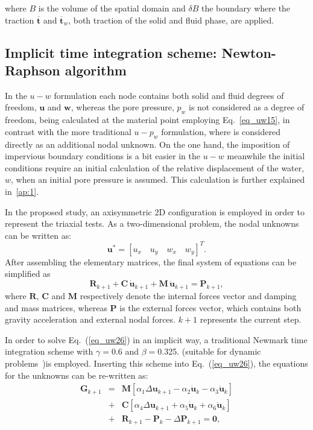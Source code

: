 \documentclass[preprint,12pt,a4paper]{elsarticle}
\begin{document}
where $B$ is the volume of the spatial domain and $\delta B$ the boundary where the traction $\boldsymbol{\overline{t}}$ and $\boldsymbol{\overline{t}}_w$, both traction of the solid and fluid phase, are applied.

\subsection{Implicit time integration scheme: Newton-Raphson algorithm}
\label{subsec:22}
In the $u-w$ formulation each node contains both solid and fluid degrees of freedom, $\boldsymbol{u}$ and $\boldsymbol{w}$, whereas the pore pressure, $p_w$ is not considered as a degree of freedom, being calculated at the material point employing Eq.~\eqref{eq_uw15}, in contrast with the more traditional  $u-p_w$ formulation, where is considered directly as an additional nodal unknown. On the one hand, the imposition of impervious boundary conditions is a bit easier in the $u-w$ meanwhile the initial conditions require an initial calculation of the relative displacement of the water, $w$, when an initial pore pressure is assumed. This calculation is further explained in~\ref{ap:1}.

In the proposed study, an axisymmetric 2D configuration is employed in order to represent the triaxial tests. As a two-dimensional problem, the nodal unknowns can be written as:
 $$
 \boldsymbol{u}^*=
 \left[ u_x \quad  u_y \quad   w_x \quad  w_y \right]^T.
$$
After assembling the elementary matrices, the final system of equations can be simplified as
\begin{equation}\label{eq_uw26}
 \boldsymbol{ R}_{k+1}  +  \boldsymbol{C}  \,   \boldsymbol{\dot{u}}_{k+1} +   \boldsymbol{M}   \, \boldsymbol {\ddot{u}}_{k+1}= \boldsymbol{P }_{k+1},
\end{equation}
where   $\boldsymbol{R}$, $ \boldsymbol{C}$ and $  \boldsymbol{ M}$ respectively denote the internal forces vector and damping and mass matrices, whereas $ \boldsymbol{P}$ is the external forces vector, which contains both gravity acceleration and external nodal forces. ${k+1}$ represents the current step.

In order to solve Eq.~(\ref{eq_uw26}) in an implicit way, a traditional Newmark time integration scheme with $\gamma=$0.6 and $\beta=$0.325. (suitable for dynamic problems~\cite{Kontoe2006})is employed. Inserting this scheme into Eq.~(\ref{eq_uw26}),  the equations for the unknowns can be re-written as:
\begin{eqnarray}\label{eq_uw30}
\boldsymbol {G}_{k+1} &=& \boldsymbol {M}\left[\alpha_1\Delta\boldsymbol {u}_{k+1}-\alpha_2\boldsymbol {\dot{u}}_{k}-\alpha_3\boldsymbol {\ddot{u}}_{k}\right] \nonumber\\
&+& 
\boldsymbol {C}\left[\alpha_4\Delta\boldsymbol {u}_{k+1} + \alpha_5\boldsymbol {\dot{u}}_{k} + \alpha_6\boldsymbol {\ddot{u}}_{k}\right] 
\nonumber\\
&+& \boldsymbol {R}_{k+1}-\boldsymbol {P}_{k}-\Delta\boldsymbol {P}_{k+1}=\boldsymbol {0},
\end{eqnarray}
\end{document}
